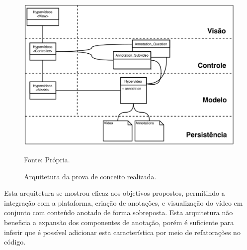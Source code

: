 \begin{figure}[h!]
	\centering
  	\includegraphics[width=.9\linewidth]{figuras/arquitetura_simpler.eps}
  	\caption{Arquitetura da prova de conceito realizada.}
	\small{Fonte: Própria.}
  	\label{fig:arquitetura_probe}
\end{figure}

Esta arquitetura se mostrou eficaz aos objetivos propostos, permitindo a integração com a plataforma, criação de anotações, e visualização do vídeo em conjunto com conteúdo anotado de forma sobreposta. Esta arquitetura não beneficia a expansão dos componentes de anotação, porém é suficiente para inferir que é possível adicionar esta característica por meio de refatorações no código. 